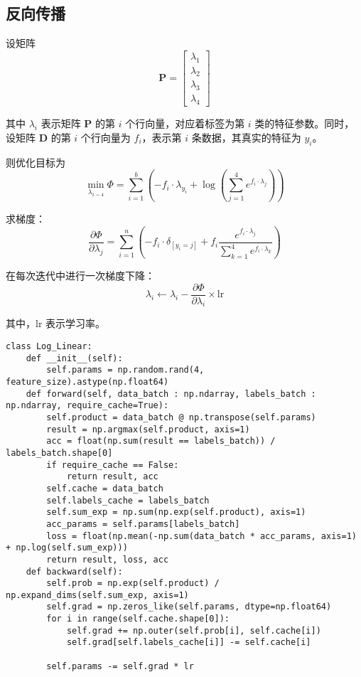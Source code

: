 \documentclass[12pt,letterpaper]{article}
\begin{document}
\subsection{反向传播}

设矩阵
\begin{equation*}
    \boldsymbol{P} = \begin{bmatrix}
    \lambda_1\\ \lambda_2 \\ \lambda_3 \\ \lambda_4
    \end{bmatrix}
\end{equation*}

其中 $\lambda_i$ 表示矩阵 $\boldsymbol{P}$ 的第 $i$ 个行向量，对应着标签为第 $i$ 类的特征参数。同时，设矩阵 $\boldsymbol{D}$ 的第 $i$ 个行向量为 $f_i$，表示第 $i$ 条数据，其真实的特征为 $y_i$。

则优化目标为
\begin{equation*}
    \min\limits_{\lambda_{1\sim 4}} \Phi = \sum_{i=1}^b \left(-f_i \cdot \lambda_{y_i} + \log\left(\sum_{j=1}^4 e^{f_i \cdot \lambda_j}\right) \right)
\end{equation*}

求梯度：
\begin{equation*}
    \frac{\partial \Phi}{\partial \lambda_j} = \sum_{i=1}^n \left( -f_i\cdot \delta_{[y_i=j]} + f_i \frac{e^{f_i\cdot \lambda_j}}{\sum\limits_{k=1}^4 e^{f_i\cdot \lambda_k}} \right)
\end{equation*}

在每次迭代中进行一次梯度下降：
\begin{equation*}
    \lambda_i \gets \lambda_i - \frac{\partial \Phi}{\partial \lambda_i}\times \mathrm{lr}
\end{equation*}

其中，$\mathrm{lr}$ 表示学习率。


\begin{verbatim}
class Log_Linear:
    def __init__(self):
        self.params = np.random.rand(4, feature_size).astype(np.float64)
    def forward(self, data_batch : np.ndarray, labels_batch : np.ndarray, require_cache=True):
        self.product = data_batch @ np.transpose(self.params)
        result = np.argmax(self.product, axis=1)
        acc = float(np.sum(result == labels_batch)) / labels_batch.shape[0]
        if require_cache == False:
            return result, acc
        self.cache = data_batch
        self.labels_cache = labels_batch
        self.sum_exp = np.sum(np.exp(self.product), axis=1)
        acc_params = self.params[labels_batch]
        loss = float(np.mean(-np.sum(data_batch * acc_params, axis=1) + np.log(self.sum_exp)))
        return result, loss, acc
    def backward(self):
        self.prob = np.exp(self.product) / np.expand_dims(self.sum_exp, axis=1)
        self.grad = np.zeros_like(self.params, dtype=np.float64)
        for i in range(self.cache.shape[0]):
            self.grad += np.outer(self.prob[i], self.cache[i])
            self.grad[self.labels_cache[i]] -= self.cache[i]

        self.params -= self.grad * lr
\end{verbatim}
\end{document}
